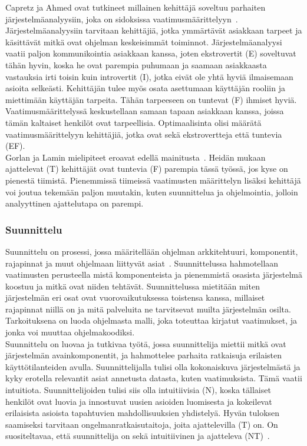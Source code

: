 \documentclass[finnish]{../tktltiki2}
\theoremstyle{definition}
\theoremstyle{remark}
\begin{document}
Capretz ja Ahmed ovat tutkineet millainen kehittäjä soveltuu
parhaiten järjestelmäanalyysiin, joka on sidoksissa vaatimusmäärittelyyn~\cite{Capretz:2010:MSS:1726559.1726574}.
Järjestelmä\-analyysiin tarvitaan kehittäjiä, jotka ymmärtävät asiakkaan tarpeet ja käsittävät mitkä ovat ohjelman keskeisimmät toiminnot.
Järjestelmäanalyysi vaatii paljon kommunikointia asiakkaan kanssa,
joten ekstrovertit (E) soveltuvat tähän hyvin, koska he ovat parempia
puhumaan ja saamaan asiakkaasta vastauksia irti toisin kuin introvertit (I), jotka eivät ole yhtä hyviä ilmaisemaan asioita selkeästi. 
Kehittäjän tulee myös osata asettumaan käyttäjän rooliin ja miettimään
käyttäjän tarpeita. Tähän tarpeeseen on tuntevat (F) ihmiset hyviä. Vaatimusmäärittelyssä keskustellaan samaan tapaan asiakkaan kanssa, joissa tämän kaltaiset henkilöt ovat tarpeellisia. Optimaalisinta olisi määrätä vaatimusmäärittelyyn kehittäjiä, jotka ovat sekä ekstrovertteja että tuntevia (EF).\\

Gorlan ja Lamin mielipiteet eroavat edellä mainitusta~\cite{Gorla:2004:WWB:990680.990684}. Heidän mukaan ajattelevat (T) kehittäjät ovat tuntevia (F) parempia tässä työssä, jos kyse on pienestä tiimistä. Pienemmissä tiimeissä vaatimusten määrittelyn lisäksi kehittäjä voi joutua tekemään paljon muutakin, kuten suunnittelua ja ohjelmointia, jolloin analyyttinen ajattelutapa on parempi.

\subsubsection{Suunnittelu}

Suunnittelu on prosessi, jossa määritellään ohjelman arkkitehtuuri, komponentit, rajapinnat ja muut ohjelmaan liittyvät asiat~\cite{SWEBOK:409902}.
Suunnittelussa hahmotellaan vaatimusten perusteella mistä komponenteista ja pienemmistä osasista järjestelmä koostuu ja mitkä ovat niiden tehtävät. Suunnittelussa mietitään miten järjestelmän eri osat ovat vuorovaikutuksessa toistensa kanssa, millaiset rajapinnat niillä on ja mitä palveluita ne tarvitsevat muilta järjestelmän osilta.
Tarkoituksena on luoda ohjelmasta malli, joka toteuttaa kirjatut vaatimukset, ja jonka voi muuttaa ohjelmakoodiksi.\\

Suunnittelu on luovaa ja tutkivaa työtä, jossa suunnittelija miettii mitkä ovat järjestelmän avainkomponentit, ja hahmottelee parhaita ratkaisuja erilaisten käyttötilanteiden avulla. Suunnittelijalla tulisi olla kokonaiskuva järjestelmästä ja kyky erotella relevantit asiat annetusta datasta, kuten vaatimuksista. Tämä vaatii intuitiota.
Suunnittelijoiden tulisi siis olla intuitiivisia (N), koska tällaiset henkilöt ovat luovia ja innostuvat uusien asioiden luomisesta ja kokeilevat erilaisista asioista tapahtuvien mahdollisuuksien yhdistelyä. Hyvän tuloksen saamiseksi tarvitaan ongelmanratkaisutaitoja, joita ajattelevilla (T) on. On suositeltavaa, että suunnittelija on sekä intuitiivinen ja ajatteleva (NT)~\cite{Capretz:2010:MSS:1726559.1726574}.
\end{document}
